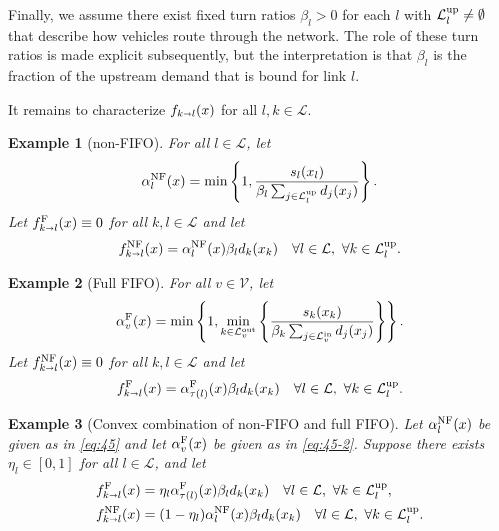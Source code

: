 \documentclass[letterpaper, 10 pt, conference]{ieeeconf}
\newcommand{\sra}{\shortrightarrow}
\newtheorem{example}{Example}
\newcommand{\fluxin}{s}
\newcommand{\fluxout}{d}
\newcommand{\Verts}{\mathcal{V}}
\newcommand{\Links}{\mathcal{L}}
\newcommand{\Lin}{\mathcal{L}^\textnormal{in}}
\newcommand{\Lout}{\mathcal{L}^\textnormal{out}}
\newcommand{\Lup}{\mathcal{L}^\textnormal{up}}
\newcommand{\tail}{{\tau}}
\newcommand{\flow}{f}
\newcommand{\alphaF}{\alpha^\textnormal{F}}
\newcommand{\alphaNF}{\alpha^\textnormal{NF}}
\begin{document}
Finally, we assume there exist fixed turn ratios $\beta_{l}> 0$ for each $l$ with $\Lup_l\neq \emptyset$ that describe how vehicles route through the network. The role of these turn ratios is made explicit subsequently, but the interpretation is that $\beta_l$ is the fraction of the upstream demand that is bound for link $l$. 



 It remains to characterize $\flow_{k\sra l}(x)$ for all $l,k\in\Links$.

\begin{example}[non-FIFO]
\label{ex:1}
For all $l\in\Links$, let
  \begin{align}
    \label{eq:45}
    \alphaNF_l(x)=\min\left\{1,\frac{\fluxin_l(x_l)}{\beta_{l}\sum_{j\in\Lup_l} \fluxout_j(x_j)}\right\}.
  \end{align}
Let $\fF_{k\sra l}(x)\equiv 0$ for all $k,l\in\Links$ and let
\begin{align}
  \label{eq:47}
  \fNF_{k\sra l}(x)=\alphaNF_l(x) \beta_l\fluxout_k(x_k)\quad \forall l\in\Links, \ \forall k\in\Lup_l.
\end{align}
\end{example}


\begin{example}[Full FIFO]
\label{ex:2}
For all $v\in\Verts$, let
  \begin{align}
    \label{eq:45-2}
    \alphaF_v(x)=\min\left\{1,\min_{k\in\Lout_v}\left\{\frac{\fluxin_k(x_k)}{\beta_{k}\sum_{j\in\Lin_v} \fluxout_j(x_j)}\right\}\right\}.
  \end{align}
Let $\fNF_{k\sra l}(x)\equiv 0$ for all $k,l\in\Links$ and let
\begin{align}
  \label{eq:47}
  \fF_{k\sra l}(x)=\alphaF_{\tail(l)}(x) \beta_l\fluxout_k(x_k)\quad \forall l\in\Links, \ \forall k\in\Lup_l.
\end{align}
\end{example}

\begin{example}[Convex combination of non-FIFO and full FIFO]
\label{ex:3}
  Let $\alphaNF_l(x)$ be given as in \eqref{eq:45} and let $\alphaF_v(x)$ be given as in \eqref{eq:45-2}. Suppose there exists $\eta_l\in[0,1]$ for all $l\in\Links$, and let
  \begin{align}
    \label{eq:48}
  \fF_{k\sra l}(x)&=\eta_l\alphaF_{\tail(l)}(x) \beta_l\fluxout_k(x_k)\quad \forall l\in\Links, \ \forall k\in\Lup_l,\\
      \fNF_{k\sra l}(x)&=(1-\eta_l) \alphaNF_l(x) \beta_l\fluxout_k(x_k)\quad \forall l\in\Links, \ \forall k\in\Lup_l.
  \end{align}
\end{example}
\end{document}
